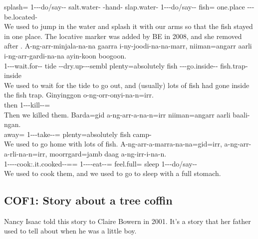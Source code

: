 \begin{exye}
splash= 1---do/say-- salt.water- -hand- slap.water- 1---do/say-- fish= one.place ---be.located-\\
\ft We used to jump in the water and splash it with our arms so that the fish stayed in one place.
\nt The locative marker  was added by BE in 2008, and she removed  after .
\exy {}
\gll A-ng-arr-minjala-na-na gaarra i-ny-joodi-na-na-marr, niiman=angarr aarli i-ng-arr-gardi-na-na ayin-koon boogoon.\\
1---wait.for-- tide --dry.up---sembl plenty=absolutely fish ---go.inside-- fish.trap- inside\\
\ft We used to wait for the tide to go out, and (usually) lots of fish had gone inside the fish trap.
\exy {}
\gll Ginyinggon o-ng-orr-onyi-na-n=irr.\\
then 1---kill--=\\
\ft Then we killed them.
\exy {}
\gll Barda=gid a-ng-arr-a-na-n=irr niiman=angarr aarli baali-ngan.\\
away= 1---take--= plenty=absolutely fish camp-\\
\ft We used to go home with lots of fish.
\exy {}
\gll A-ng-arr-a-marra-na-na=gid=irr, a-ng-arr-a-rli-na-n=irr, moorrgard=jamb daag a-ng-irr-i-na-n.\\
1----cook:.it.cooked--== 1----eat--= feel.full= sleep 1---do/say--\\
\ft We used to cook them, and we used to go to sleep with a full stomach.
\end{exye}

\subsection{COF1: Story about a tree coffin}
Nancy Isaac told this story to Claire Bowern in 2001. It's a story that her father used to tell about when he was a little boy.

